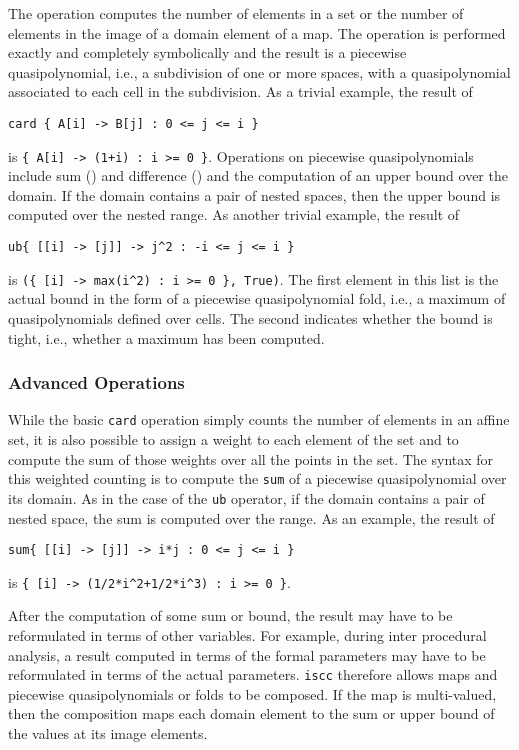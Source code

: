 The  operation computes the number of elements in a set
or the number of elements in the image of a domain element of a map.
The operation is performed exactly and completely symbolically and
the result is a piecewise quasipolynomial, i.e., a subdivision of one
or more spaces, with a quasipolynomial associated to each cell in the subdivision.
As a trivial example, the result of
\begin{verbatim}
card { A[i] -> B[j] : 0 <= j <= i }
\end{verbatim}
is \verb!{ A[i] -> (1+i) : i >= 0 }!.
Operations on piecewise quasipolynomials include sum (\ai[\tt]{+})
and difference (\ai[\tt]{-}) and the computation of an upper bound over the domain.
If the domain contains a pair of nested spaces, then the upper bound is computed over
the nested range.  As another trivial example, the result of
\begin{verbatim}
ub{ [[i] -> [j]] -> j^2 : -i <= j <= i }
\end{verbatim}
is
\verb!({ [i] -> max(i^2) : i >= 0 }, True)!.
The first element in this list is the actual bound in the form
of a piecewise quasipolynomial fold,
i.e., a maximum of quasipolynomials defined over cells.
The second indicates whether the bound is tight, i.e., whether
a maximum has been computed.

\subsubsection{Advanced Operations}

While the basic {\tt card} operation simply counts the number of elements
in an affine set, it is also possible to assign a weight to each element
of the set and to compute the sum of those weights over all the points in the set.
The syntax for this weighted counting is to compute the {\tt sum} of
a piecewise quasipolynomial over its domain.  As in the case of the {\tt ub}
operator, if the domain contains a pair of nested space, the sum is computed
over the range.  As an example, the result
of
\begin{verbatim}
sum{ [[i] -> [j]] -> i*j : 0 <= j <= i }
\end{verbatim}
is
\verb|{ [i] -> (1/2*i^2+1/2*i^3) : i >= 0 }|.

After the computation of some sum or bound, the result may have to
be reformulated in terms of other variables.  For example, during
inter procedural analysis, a result computed in terms of the formal
parameters may have to be reformulated in terms of the actual parameters.
{\tt iscc} therefore allows maps and
piecewise quasipolynomials or folds to be composed.
If the map is multi-valued, then the composition maps each domain element
to the sum or upper bound of the values at its image elements.


